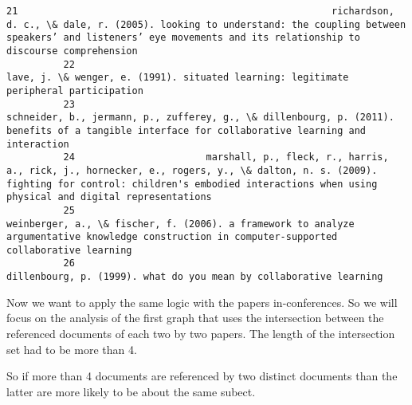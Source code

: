 \documentclass[journal,twocolumn]{IEEEtran}
\begin{document}
\begin{Verbatim}[commandchars=\\\{\}]
          21                                                       richardson, d. c., \& dale, r. (2005). looking to understand: the coupling between speakers’ and listeners’ eye movements and its relationship to discourse comprehension
          22                                                                                                                                           lave, j. \& wenger, e. (1991). situated learning: legitimate peripheral participation
          23                                                                                schneider, b., jermann, p., zufferey, g., \& dillenbourg, p. (2011). benefits of a tangible interface for collaborative learning and interaction
          24                       marshall, p., fleck, r., harris, a., rick, j., hornecker, e., rogers, y., \& dalton, n. s. (2009). fighting for control: children's embodied interactions when using physical and digital representations
          25                                                                                 weinberger, a., \& fischer, f. (2006). a framework to analyze argumentative knowledge construction in computer-supported collaborative learning
          26                                                                                                                                                             dillenbourg, p. (1999). what do you mean by collaborative learning
\end{Verbatim}
            
    Now we want to apply the same logic with the papers in-conferences. So
we will focus on the analysis of the first graph that uses the
intersection between the referenced documents of each two by two papers.
The length of the intersection set had to be more than 4.

So if more than 4 documents are referenced by two distinct documents
than the latter are more likely to be about the same subect.
\end{document}
